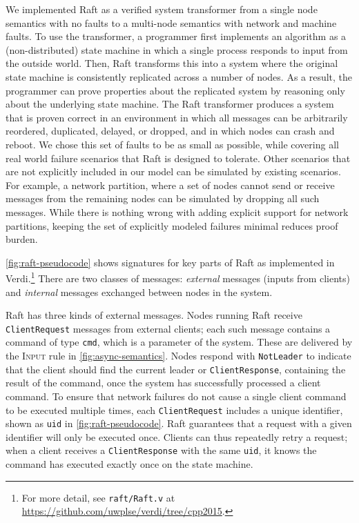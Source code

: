 We implemented Raft as a verified system transformer
from a single node semantics with no faults
to a multi-node semantics with network and machine faults.
To use the transformer,
a programmer first implements an algorithm as a (non-distributed) state machine
in which a single process responds to input from the outside world.
Then, Raft transforms this into a system where the original state machine
is consistently replicated across a number of nodes.
As a result, the programmer can prove properties about the replicated system
by reasoning only about the underlying state machine.
The Raft transformer produces a system that is proven correct in
an environment in which
all messages can be arbitrarily reordered, duplicated, delayed, or dropped,
and in which nodes can crash and reboot.
We chose this set of faults to be as small as possible, while covering all real world failure scenarios
that Raft is designed to tolerate.
Other scenarios that are not explicitly included in our model
can be simulated by existing scenarios.
For example, a network partition, where a set of nodes cannot send or receive messages
from the remaining nodes can be simulated by dropping all such messages.
While there is nothing wrong with adding explicit support for network partitions,
keeping the set of explicitly modeled failures minimal reduces proof burden.

\cref{fig:raft-pseudocode} shows signatures for key parts of
Raft as implemented in Verdi.\footnote{For
    more detail, see \texttt{raft/Raft.v} at
    \url{https://github.com/uwplse/verdi/tree/cpp2015}.}
There are two classes of messages:
\textit{external} messages (inputs from clients) and
\textit{internal} messages exchanged between nodes in the system.

Raft has three kinds of external messages.
Nodes running Raft receive \texttt{ClientRequest} messages from external clients;
each such message contains a command of type \texttt{cmd},
which is a parameter of the system. These are delivered by the
\textsc{Input} rule in \cref{fig:async-semantics}.
Nodes respond with \texttt{NotLeader}
to indicate that the client should find the current leader
or \texttt{ClientResponse}, containing the result of the command,
once the system has successfully processed a client command.
To ensure that network failures do not cause
a single client command to be executed multiple times,
each \texttt{ClientRequest} includes a unique identifier,
shown as \texttt{uid} in \cref{fig:raft-pseudocode}.
Raft guarantees that a request with a given identifier
will only be executed once.
Clients can thus repeatedly retry a request;
when a client receives a \texttt{ClientResponse}
with the same \texttt{uid},
it knows the command has executed exactly once on the state machine.

